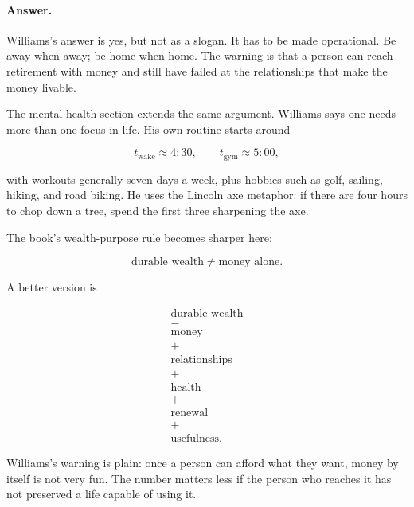 \documentclass[11pt,oneside]{book}
\begin{document}
\paragraph{Answer.}
Williams's answer is yes, but not as a slogan. It has to be made operational. Be away when away; be home when home. The warning is that a person can reach retirement with money and still have failed at the relationships that make the money livable.

The mental-health section extends the same argument. Williams says one needs more than one focus in life. His own routine starts around

\begin{equation}
t_{\mathrm{wake}}\approx 4{:}30,
\qquad
t_{\mathrm{gym}}\approx 5{:}00,
\end{equation}

with workouts generally seven days a week, plus hobbies such as golf, sailing, hiking, and road biking. He uses the Lincoln axe metaphor: if there are four hours to chop down a tree, spend the first three sharpening the axe.

The book's wealth-purpose rule becomes sharper here:

\begin{equation}
\text{durable wealth}
\neq
\text{money alone}.
\end{equation}

A better version is

\begin{equation}
\begin{gathered}
\text{durable wealth}\\
=\\
\text{money}\\
+\\
\text{relationships}\\
+\\
\text{health}\\
+\\
\text{renewal}\\
+\\
\text{usefulness}.
\end{gathered}
\end{equation}

Williams's warning is plain: once a person can afford what they want, money by itself is not very fun. The number matters less if the person who reaches it has not preserved a life capable of using it.

\end{document}
